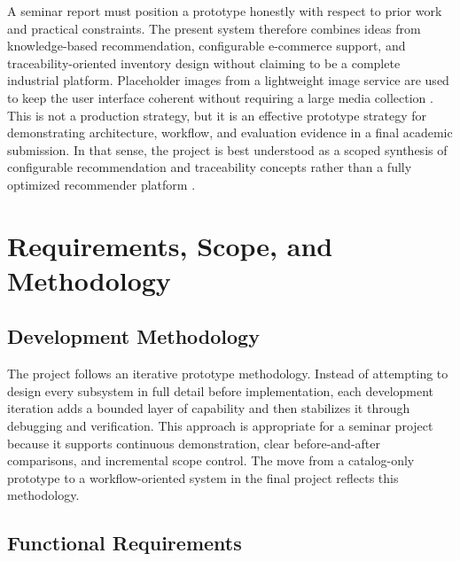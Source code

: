 \documentclass[12pt,letterpaper,oneside,openany]{book}
\begin{document}
\begin{justifying}
A seminar report must position a prototype honestly with respect to prior work
and practical constraints. The present system therefore combines ideas from
knowledge-based recommendation, configurable e-commerce support, and
traceability-oriented inventory design without claiming to be a complete
industrial platform. Placeholder images from a lightweight image service are
used to keep the user interface coherent without requiring a large media
collection \cite{placeholdco}. This is not a production strategy, but it is an
effective prototype strategy for demonstrating architecture, workflow, and
evaluation evidence in a final academic submission. In that sense, the project
is best understood as a scoped synthesis of configurable recommendation and
traceability concepts rather than a fully optimized recommender platform
\cite{scholz-config,zhang-ai-rec,traceability-review}.
\end{justifying}

\chapter{Requirements, Scope, and Methodology}

\section{Development Methodology}

\begin{justifying}
The project follows an iterative prototype methodology. Instead of attempting to
design every subsystem in full detail before implementation, each development
iteration adds a bounded layer of capability and then stabilizes it through
debugging and verification. This approach is appropriate for a seminar project
because it supports continuous demonstration, clear before-and-after
comparisons, and incremental scope control. The move from a catalog-only
prototype to a workflow-oriented system in the final project reflects this
methodology.
\end{justifying}

\section{Functional Requirements}
\end{document}

